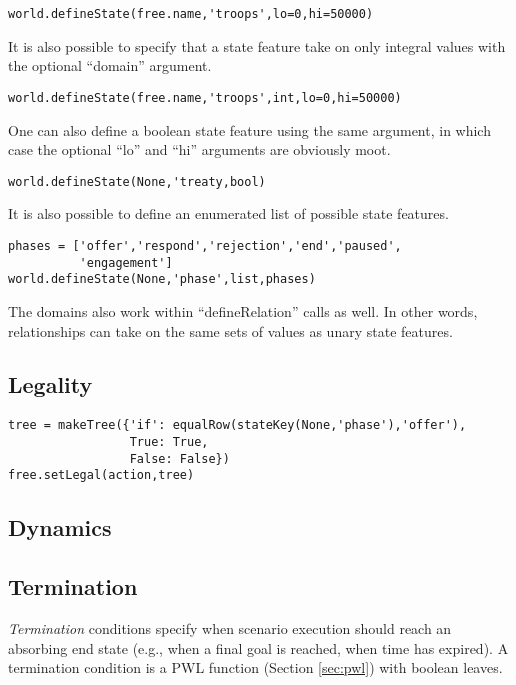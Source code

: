 \documentclass{article}
\begin{document}
\begin{verbatim}
world.defineState(free.name,'troops',lo=0,hi=50000)
\end{verbatim}

It is also possible to specify that a state feature take on only integral values with the optional ``domain'' argument.

\begin{verbatim}
world.defineState(free.name,'troops',int,lo=0,hi=50000)
\end{verbatim}

One can also define a boolean state feature using the same argument, in which case the optional ``lo'' and ``hi'' arguments are obviously moot.

\begin{verbatim}
world.defineState(None,'treaty,bool)
\end{verbatim}

It is also possible to define an enumerated list of possible state features.

\begin{verbatim}
phases = ['offer','respond','rejection','end','paused',
          'engagement']
world.defineState(None,'phase',list,phases)
\end{verbatim}

The domains also work within ``defineRelation'' calls as well. In other words, relationships can take on the same sets of values as unary state features.

\subsection{Legality}\label{sec:legality}

\begin{verbatim}
tree = makeTree({'if': equalRow(stateKey(None,'phase'),'offer'),
                 True: True,    
                 False: False})
free.setLegal(action,tree)
\end{verbatim}

\subsection{Dynamics}\label{sec:dynamics}

\subsection{Termination}

{\em Termination} conditions specify when scenario execution should reach an absorbing end state (e.g., when a final goal is reached, when time has expired). A termination condition is a PWL function (Section \ref{sec:pwl}) with boolean leaves.
\end{document}
